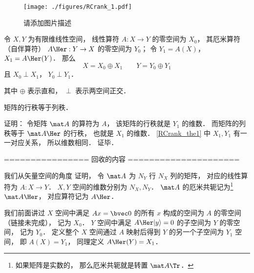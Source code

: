 
\begin{issues}
\issueDraft
\end{issues}


\begin{figure}[ht]
\centering
\texttt{[image: ./figures/RCrank\_1.pdf]}
\caption{请添加图片描述} \label{RCrank_fig1}
\end{figure}

\begin{theorem}{}\label{RCrank_the1}
令 $X, Y$ 为有限维线性空间， 线性算符 $A:X \to Y$ 的零空间为 $X_0$， 其厄米算符（自伴算符） $A\Her: Y \to X$ 的零空间为 $Y_0$； 令 $Y_1 = A(X)$， $X_1 = A\Her(Y)$． 那么
\begin{equation}
X = X_0 \oplus X_1 \qquad Y = Y_0 \oplus Y_1
\end{equation}
且 $X_0 \perp X_1$， $Y_0 \perp Y_1$．
\end{theorem}
其中 $\oplus$ 表示直和， $\perp$ 表示两空间正交．


\begin{corollary}{}
矩阵的行秩等于列秩．
\end{corollary}
证明： 令矩阵 $\mat A$ 的算符为 $A$， 该矩阵的行秩就是 $Y_1$ 的维数． 而矩阵的列秩等于 $\mat A\Her$ 的行秩， 也就是 $X_1$ 的维数． \autoref{RCrank_the1} 中 $X_1, Y_1$ 有一一对应关系， 所以维数相同． 证毕．

================ 回收的内容 =====================

我们从矢量空间的角度 证明， 令 $\mat A$ 为 $N_Y$ 行 $N_X$ 列的矩阵， 对应的线性算符为 $A: X\to Y$． $X, Y$ 空间的维数分别为 $N_X, N_Y$． $\mat A$ 的厄米共轭记为\footnote{如果矩阵是实数的， 那么厄米共轭就是转置 $\mat A\Tr$．} $\mat A\Her$， 对应算符记为 $A\Her$．

我们前面讲过 $X$ 空间中满足 $A {x} = \bvec 0$ 的所有 ${x}$ 构成的空间为 $A$ 的零空间（链接未完成）， 记为 $X_0$． $Y$ 空间中满足 $A\Her |y\rangle = 0$ 的子空间为 $Y$ 的零空间， 记为 $Y_0$． 定义整个 $X$ 空间通过 $A$ 映射后得到 $Y$ 的另一个子空间为 $Y_1$ 空间， 即 $A(X) = Y_1$， 同理定义 $A\Her(Y) = X_1$． %

